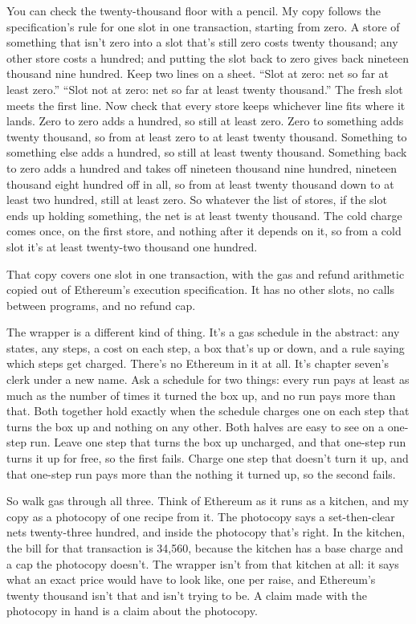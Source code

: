 \documentclass[11pt,twoside]{article}
\theoremstyle{thielethm}
\theoremstyle{thieledef}
\theoremstyle{thieledef}
\theoremstyle{thieledef}
\theoremstyle{thielethm}
\theoremstyle{thieleobs}
\theoremstyle{thielethm}
\begin{document}
You can check the twenty-thousand floor with a pencil. My copy follows the specification's rule for one slot in one transaction, starting from zero. A store of something that isn't zero into a slot that's still zero costs twenty thousand; any other store costs a hundred; and putting the slot back to zero gives back nineteen thousand nine hundred. Keep two lines on a sheet. ``Slot at zero: net so far at least zero.'' ``Slot not at zero: net so far at least twenty thousand.'' The fresh slot meets the first line. Now check that every store keeps whichever line fits where it lands. Zero to zero adds a hundred, so still at least zero. Zero to something adds twenty thousand, so from at least zero to at least twenty thousand. Something to something else adds a hundred, so still at least twenty thousand. Something back to zero adds a hundred and takes off nineteen thousand nine hundred, nineteen thousand eight hundred off in all, so from at least twenty thousand down to at least two hundred, still at least zero. So whatever the list of stores, if the slot ends up holding something, the net is at least twenty thousand. The cold charge comes once, on the first store, and nothing after it depends on it, so from a cold slot it's at least twenty-two thousand one hundred.

That copy covers one slot in one transaction, with the gas and refund arithmetic copied out of Ethereum's execution specification. It has no other slots, no calls between programs, and no refund cap.

The wrapper is a different kind of thing. It's a gas schedule in the abstract: any states, any steps, a cost on each step, a box that's up or down, and a rule saying which steps get charged. There's no Ethereum in it at all. It's chapter seven's clerk under a new name. Ask a schedule for two things: every run pays at least as much as the number of times it turned the box up, and no run pays more than that. Both together hold exactly when the schedule charges one on each step that turns the box up and nothing on any other. Both halves are easy to see on a one-step run. Leave one step that turns the box up uncharged, and that one-step run turns it up for free, so the first fails. Charge one step that doesn't turn it up, and that one-step run pays more than the nothing it turned up, so the second fails.

So walk gas through all three. Think of Ethereum as it runs as a kitchen, and my copy as a photocopy of one recipe from it. The photocopy says a set-then-clear nets twenty-three hundred, and inside the photocopy that's right. In the kitchen, the bill for that transaction is 34,560, because the kitchen has a base charge and a cap the photocopy doesn't. The wrapper isn't from that kitchen at all: it says what an exact price would have to look like, one per raise, and Ethereum's twenty thousand isn't that and isn't trying to be. A claim made with the photocopy in hand is a claim about the photocopy.
\end{document}
